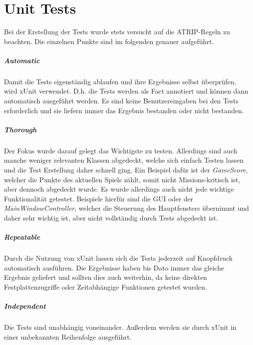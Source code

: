 \chapter{Unit Tests}

Bei der Erstellung der Tests wurde stets versucht auf die ATRIP-Regeln zu beachten. Die einzelnen Punkte sind im folgenden genauer aufgeführt.

\paragraph{Automatic}
Damit die Tests eigenständig ablaufen und ihre Ergebnisse selbst überprüfen, wird xUnit verwendet. D.h. die Tests werden als \glqq Fact\grqq{} annotiert und können dann automatisch ausgeführt werden. Es sind keine Benutzereingaben bei den Tests erforderlich und sie liefern immer das Ergebnis \glqq bestanden\grqq{} oder \glqq nicht bestanden\grqq{}.

\paragraph{Thorough}
Der Fokus wurde darauf gelegt das Wichtigste zu testen. Allerdings sind auch manche weniger relevanten Klassen abgedeckt, welche sich einfach Testen lassen und die Test Erstellung daher schnell ging. Ein Beispiel dafür ist der \textit{GameScore}, welcher die Punkte des aktuellen Spiels zählt, somit nicht Missions-kritisch ist, aber dennoch abgedeckt wurde. Es wurde allerdings auch nicht jede wichtige Funktionalität getestet. Beispiele hierfür sind die GUI oder der \textit{MainWindowController}, welcher die Steuerung des Hauptfensters übernimmt und daher sehr wichtig ist, aber nicht vollständig durch Tests abgedeckt ist.

\paragraph{Repeatable}
Durch die Nutzung von xUnit lassen sich die Tests jederzeit auf Knopfdruck automatisch ausführen. Die Ergebnisse haben bis Dato immer das gleiche Ergebnis geliefert und sollten dies auch weiterhin, da keine direkten Festplattenzugriffe oder Zeitabhängige Funktionen getestet wurden. 

\paragraph{Independent}
Die Tests sind unabhängig voneinander. Außerdem werden sie durch xUnit in einer unbekannten Reihenfolge ausgeführt.

